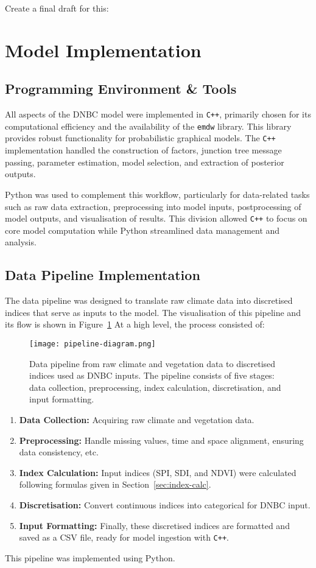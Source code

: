 Create a final draft for this:

\section{Model Implementation}

\subsection{Programming Environment \& Tools}
All aspects of the DNBC model were implemented in \texttt{C++}, primarily chosen for its computational efficiency and the availability of the \texttt{emdw} library. This library provides robust functionality for probabilistic graphical models. The \texttt{C++} implementation handled the construction of factors, junction tree message passing, parameter estimation, model selection, and extraction of posterior outputs.  

Python was used to complement this workflow, particularly for data-related tasks such as raw data extraction, preprocessing into model inputs, postprocessing of model outputs, and visualisation of results. This division allowed \texttt{C++} to focus on core model computation while Python streamlined data management and analysis.

\subsection{Data Pipeline Implementation}
The data pipeline was designed to translate raw climate data into discretised indices that serve as inputs to the model. The visualisation of this pipeline and its flow is shown in Figure~\ref{fig:pipeline-diagram}
At a high level, the process consisted of:

\begin{figure}[!h]
    \centering
    \texttt{[image: pipeline-diagram.png]}
    \caption[Data pipeline for DNBC inputs]{Data pipeline from raw climate and vegetation data to discretised indices used as DNBC inputs. The pipeline consists of five stages: data collection, preprocessing, index calculation, discretisation, and input formatting.}
    \label{fig:pipeline-diagram}
\end{figure}


\begin{enumerate}
    \item \textbf{Data Collection:} Acquiring raw climate and vegetation data.
    \item \textbf{Preprocessing:} Handle missing values, time and space alignment, ensuring data consistency, etc.
    \item \textbf{Index Calculation:} Input indices (SPI, SDI, and NDVI) were calculated following formulas given in Section~\ref{sec:index-calc}.
    \item \textbf{Discretisation:} Convert continuous indices into categorical for DNBC input.
    \item \textbf{Input Formatting:} Finally, these discretised indices are formatted and saved as a CSV file, ready for model ingestion with \texttt{C++}.
\end{enumerate}
This pipeline was implemented using Python.

